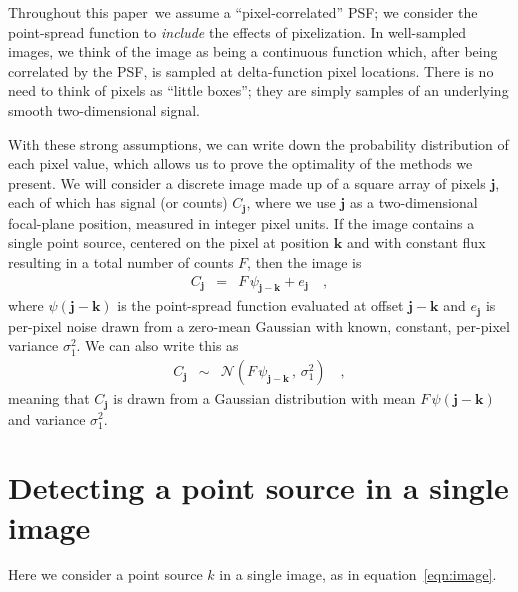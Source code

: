 \documentclass[letterpaper,preprint]{aastex62}
\newcommand{\doctype}{paper}
\newcommand{\equationname}{equation}
\newcommand{\eqnref}[1]{\mbox{\equationname~\ref{#1}}}
\newcommand{\drawnfrom}{\sim}
\newcommand{\gaussianN}{\mathcal{N}}
\newcommand{\gaussx}[2]{\gaussianN\!\left(#1 \, , \, #2\right)}
\newcommand{\psf}{\psi}
\newcommand{\psfat}[1]{\psf_{#1}}
\newcommand{\noise}{e}
\renewcommand{\vec}[1]{\boldsymbol{#1}}
\newcommand{\jvec}{\vec{j}}
\newcommand{\kvec}{\vec{k}}
\begin{document}
Throughout this \doctype\ we assume a ``pixel-correlated'' PSF; we
consider the point-spread function to \emph{include} the effects of
pixelization.  In well-sampled images, we think of the image as being
a continuous function which, after being correlated by the PSF, is
sampled at delta-function pixel locations.  There is no need to think
of pixels as ``little boxes''; they are simply samples of an
underlying smooth two-dimensional signal.



With these strong assumptions, we can write down the probability
distribution of each pixel value, which allows us to prove the
optimality of the methods we present.
%
We will consider a discrete image made up of a square array of pixels
$\jvec$, each of which has signal (or counts) $C_{\jvec}$, where we
use $\jvec$ as a two-dimensional focal-plane position, measured in
integer pixel units.
%
If the image contains a single point source, centered on
the pixel at position $\kvec$ and with constant flux resulting in a
total number of counts $F$, then the image is
\begin{eqnarray}
  C_{\jvec} &=& F \, \psfat{\jvec - \kvec} + \noise_{\jvec} \quad ,
  \label{eqn:image}
\end{eqnarray}
where $\psi(\jvec-\kvec)$ is the point-spread function evaluated at
offset $\jvec-\kvec$ and $\noise_{\jvec}$ is per-pixel noise drawn
from a zero-mean Gaussian with known, constant, per-pixel variance $\sigma_1^2$.
%
We can also write this as
\begin{eqnarray}
  C_{\jvec} &\drawnfrom& \gaussx{F \, \psfat{\jvec - \kvec}}{\sigma_1^2}
  \quad ,
\end{eqnarray}
meaning that $C_{\jvec}$ is drawn from a Gaussian distribution with
mean $F\, \psf(\jvec - \kvec)$ and variance $\sigma_1^2$.


\section{Detecting a point source in a single image}


Here we consider a point source $k$ in a single image, as in
\eqnref{eqn:image}.
\end{document}
